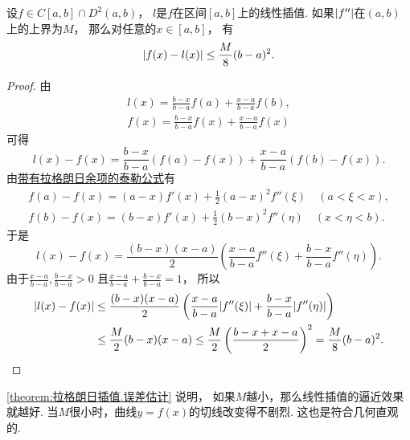 \begin{theorem}\label{theorem:拉格朗日插值.误差估计}
设\(f\in C[a,b]\cap D^2(a,b)\)，
\(l\)是\(f\)在区间\([a,b]\)上的线性插值.
如果\(\abs{f''}\)在\((a,b)\)上的上界为\(M\)，
那么对任意的\(x\in[a,b]\)，
有\[
	\abs{f(x)-l(x)}
	\leq \frac{M}8 (b-a)^2.
\]
\begin{proof}
由\begin{gather*}
	l(x) = \frac{b-x}{b-a} f(a) + \frac{x-a}{b-a} f(b), \\
	f(x) = \frac{b-x}{b-a} f(x) + \frac{x-a}{b-a} f(x)
\end{gather*}
可得\[
	l(x) - f(x)
	= \frac{b-x}{b-a} (f(a) - f(x))
	+ \frac{x-a}{b-a} (f(b) - f(x)).
\]
由\hyperref[equation:微分中值定理.泰勒公式.余项1]{带有拉格朗日余项的泰勒公式}有\begin{gather*}
	f(a) - f(x)
	= (a-x) f'(x) + \frac12 (a-x)^2 f''(\xi)
	\quad(a<\xi<x), \\
	f(b) - f(x)
	= (b-x) f'(x) + \frac12 (b-x)^2 f''(\eta)
	\quad(x<\eta<b).
\end{gather*}
于是\[
	l(x) - f(x)
	= \frac{(b-x)(x-a)}2
	\left(
		\frac{x-a}{b-a} f''(\xi)
		+ \frac{b-x}{b-a} f''(\eta)
	\right).
\]
由于\(\frac{x-a}{b-a},\frac{b-x}{b-a}>0\)
且\(\frac{x-a}{b-a}+\frac{b-x}{b-a}=1\)，
所以\begin{align*}
	\abs{l(x) - f(x)}
	&\leq
	\frac{(b-x)(x-a)}2
	\left(
		\frac{x-a}{b-a} \abs{f''(\xi)}
		+ \frac{b-x}{b-a} \abs{f''(\eta)}
	\right) \\
	&\leq
	\frac{M}2 (b-x)(x-a)
	\leq
	\frac{M}2 \left(
		\frac{b-x+x-a}2
	\right)^2
	= \frac{M}8 (b-a)^2.
	\qedhere
\end{align*}
\end{proof}
\end{theorem}
\begin{remark}
\cref{theorem:拉格朗日插值.误差估计} 说明，
如果\(M\)越小，那么线性插值的逼近效果就越好.
当\(M\)很小时，曲线\(y=f(x)\)的切线改变得不剧烈.
这也是符合几何直观的.
\end{remark}

